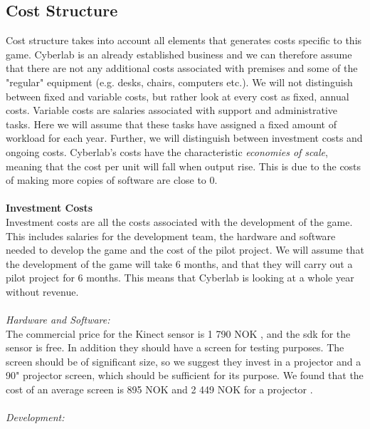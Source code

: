 \subsection{Cost Structure}
Cost structure takes into account all elements that generates costs specific to this game. Cyberlab is an already established business and we can therefore assume that there are not any additional costs associated with premises and some of the "regular" equipment (e.g. desks, chairs, computers etc.). We will not distinguish between fixed and variable costs, but rather look at every cost as fixed, annual costs. Variable costs are salaries associated with support and administrative tasks. Here we will assume that these tasks have assigned a fixed amount of workload for each year. Further, we will distinguish between investment costs and ongoing costs. Cyberlab's costs have the characteristic \emph{economies of scale}, meaning that the cost per unit will fall when output rise. This is due to the costs of making more copies of software are close to 0. \\ \\
\textbf{Investment Costs}\\
Investment costs are all the costs associated with the development of the game. This includes salaries for the development team, the hardware and software needed to develop the game and the cost of the pilot project. We will assume that the development of the game will take 6 months, and that they will carry out a pilot project for 6 months. This means that Cyberlab is looking at a whole year without revenue.\\ \\
\emph{Hardware and Software:}\\
The commercial price for the Kinect sensor is 1 790 NOK \cite{pricekinect}, and the \ac{sdk} for the sensor is free. In addition they should have a screen for testing purposes. The screen should be of significant size, so we suggest they invest in a projector and a 90" projector screen, which should be sufficient for its purpose. We found that the cost of an average screen is 895 NOK and 2 449 NOK for a projector \cite{priceprojector}\cite{pricescreen}.\\ \\
\emph{Development:}\\
